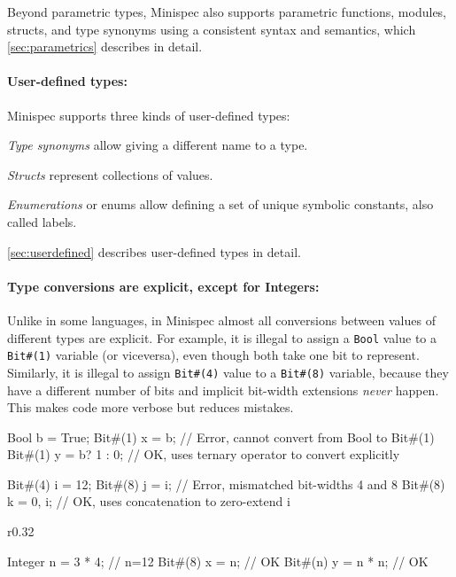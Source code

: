 Beyond parametric types, Minispec also supports parametric functions, modules, structs, and type synonyms
using a consistent syntax and semantics, which \autoref{sec:parametrics} describes in detail.

\paragraph{User-defined types:} Minispec supports three kinds of user-defined types:
\begin{compactitem}
\item \emph{Type synonyms} allow giving a different name to a type.
\item \emph{Structs} represent collections of values.
\item \emph{Enumerations} or enums allow defining a set of unique symbolic constants, also called labels.
\end{compactitem}
\autoref{sec:userdefined} describes user-defined types in detail.

\paragraph{Type conversions are explicit, except for Integers:}
Unlike in some languages, in Minispec almost all conversions between values of different types are explicit.
For example, it is illegal to assign a \texttt{Bool} value to a \texttt{Bit\#(1)} variable (or viceversa),
even though both take one bit to represent.
Similarly, it is illegal to assign \texttt{Bit\#(4)} value to a \texttt{Bit\#(8)} variable, because they have a different number of bits
and implicit bit-width extensions \emph{never} happen.
This makes code more verbose but reduces mistakes.

\begin{mscode}
Bool b = True;
Bit#(1) x = b;         // Error, cannot convert from Bool to Bit#(1)
Bit#(1) y = b? 1 : 0;  // OK, uses ternary operator to convert explicitly

Bit#(4) i = 12;
Bit#(8) j = i;         // Error, mismatched bit-widths 4 and 8
Bit#(8) k = {0, i};    // OK, uses concatenation to zero-extend i
\end{mscode}

\begin{wrapfigure}{r}{0.32\columnwidth}
\vspace{-1.8em}
\begin{mscode}
Integer n = 3 * 4;  // n=12
Bit#(8) x = n;      // OK
Bit#(n) y = n * n;  // OK
\end{mscode}
\vspace{-2em}
\end{wrapfigure}

